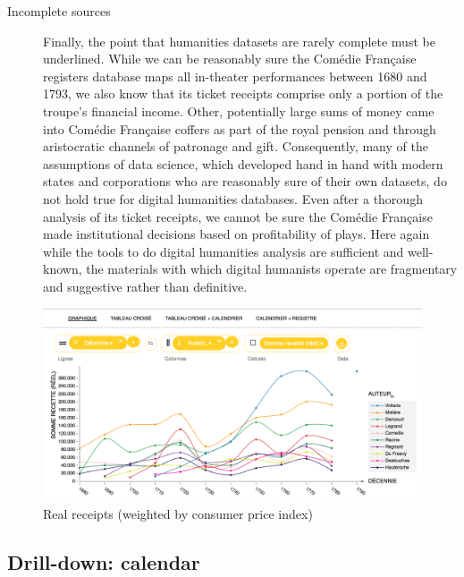\documentclass[	DIV=calc,%
							paper=a4,%
							fontsize=11pt,%
							twocolumn]{scrartcl}	 					%
\begin{document}
\begin{description}
	\item[Incomplete sources] Finally, the point that humanities datasets are rarely complete must be underlined.  While we can be reasonably sure the Comédie Française registers database maps all in-theater performances between 1680 and 1793, we also know that its ticket receipts comprise only a portion of the troupe's financial income.  Other, potentially large sums of money came into Comédie Française coffers as part of the royal pension and through aristocratic channels of patronage and gift.\cite{BROWN:2004}  Consequently, many of the assumptions of data science, which developed hand in hand with modern states and corporations who are reasonably sure of their own datasets, do not hold true for digital humanities databases.  Even after a thorough analysis of its ticket receipts, we cannot be sure the Comédie Française made institutional decisions based on profitability of plays.  Here again while the tools to do digital humanities analysis are sufficient and well-known, the materials with which digital humanists operate are fragmentary and suggestive rather than definitive.

\end{description}

\begin{figure}
  \centering
	\includegraphics[width=7in]{steps/top-author-receipts-real.png}
	\caption{Real receipts (weighted by consumer price index)}
	\label{fig:top-author-receipts-real}
\end{figure}

\subsection*{Drill-down: calendar}
\end{document}
